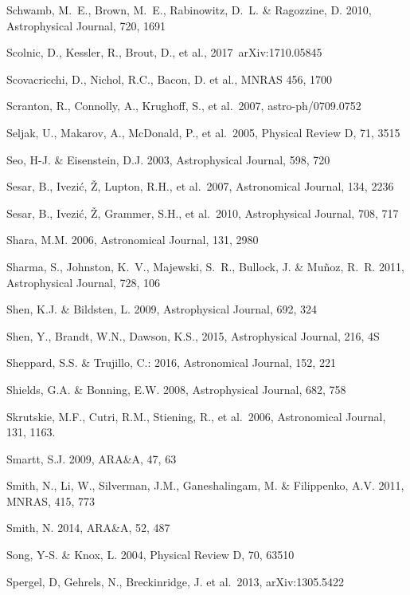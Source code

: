 \documentclass{emulateapj}
\begin{document}
\begin{thebibliography}{}
\bibitem[()]{} Schwamb, M.~E., Brown, M.~E., Rabinowitz, D.~L. \& Ragozzine, D. 2010, Astrophysical Journal, 720, 1691

\bibitem[()]{} Scolnic, D., Kessler, R., Brout, D., et al., 2017~arXiv:1710.05845

\bibitem[()]{} Scovacricchi, D., Nichol, R.C., Bacon, D. et al., MNRAS 456, 1700

\bibitem[()]{} Scranton, R., Connolly, A., Krughoff, S., et al.~2007, astro-ph/0709.0752

\bibitem[()]{} Seljak, U., Makarov, A., McDonald, P., et al.~2005,  Physical Review D, 71, 3515

\bibitem[()]{} Seo, H-J. \& Eisenstein, D.J. 2003, Astrophysical Journal, 598, 720

\bibitem[()]{} Sesar, B., Ivezi\'{c}, \v{Z}, Lupton, R.H., et al.~2007, Astronomical Journal, 134, 2236

\bibitem[()]{} Sesar, B., Ivezi\'{c}, \v{Z}, Grammer, S.H., et al.~2010, Astrophysical Journal, 708, 717

\bibitem[()]{} Shara, M.M. 2006, Astronomical Journal, 131, 2980

\bibitem[()]{} Sharma, S., Johnston, K.~V., Majewski, S.~R., Bullock, J. \& Mu{\~n}oz, R.~R. 2011,
                      Astrophysical Journal, 728, 106

\bibitem[()]{} Shen, K.J. \& Bildsten, L. 2009, Astrophysical Journal, 692, 324

\bibitem[()]{} Shen, Y., Brandt, W.N., Dawson, K.S., 2015, Astrophysical Journal, 216, 4S

\bibitem[()]{}  Sheppard, S.S.  \&  Trujillo, C.: 2016, Astronomical Journal, 152, 221

\bibitem[()]{} Shields, G.A. \& Bonning, E.W. 2008, Astrophysical Journal, 682, 758

\bibitem[()]{} Skrutskie, M.F., Cutri, R.M., Stiening, R., et al.~2006, Astronomical Journal, 131, 1163.

\bibitem[()]{} Smartt, S.J. 2009, ARA\&A, 47, 63

\bibitem[()]{} Smith, N., Li, W., Silverman, J.M., Ganeshalingam, M. \& Filippenko, A.V. 2011, MNRAS, 415, 773

\bibitem[()]{} Smith, N. 2014, ARA\&A, 52, 487

\bibitem[()]{} Song, Y-S. \& Knox, L. 2004, Physical Review D, 70, 63510

\bibitem[()]{} Spergel, D, Gehrels, N., Breckinridge, J. et al.~2013, arXiv:1305.5422


\end{thebibliography}
\end{document}
